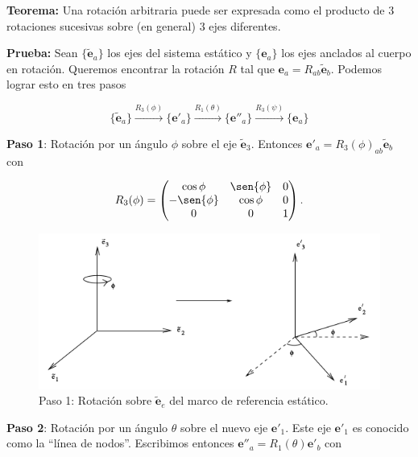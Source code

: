 \documentclass[a4paper,10pt]{article}
\numberwithin{equation}{section}
\newcommand{\teorema}{\textbf{Teorema: }}
\newcommand{\prueba}{\textbf{Prueba: }}
\begin{document}
\teorema Una rotación arbitraria puede ser expresada como el producto de $3$ rotaciones 
sucesivas sobre (en general) $3$ ejes diferentes.

\vspace{.3cm}

\prueba Sean $\{{\tilde{\mathbf{e}}_a\}}$ los ejes del sistema estático y 
$\{{\mathbf{e}_a\}}$ los ejes anclados al cuerpo en rotación. Queremos encontrar 
la rotación $R$ tal que $\mathbf{e}_a = R_{ab}{\tilde{\mathbf{e}}_b}$. Podemos 
lograr esto en tres pasos

\begin{equation}
 \{{\tilde{\mathbf{e}}_a\}} \xrightarrow{R_3(\phi)} 
 \{{\mathbf{e}'_a\}} \xrightarrow{R_1(\theta)} 
 \{{\mathbf{e}''_a\}} \xrightarrow{R_3(\psi)} \{{\mathbf{e}_a\}}
\end{equation}

\textbf{Paso 1}: Rotación por un ángulo $\phi$ sobre el eje $\tilde{\mathbf{e}}_3$. 
Entonces $\mathbf{e}'_a = R_3(\phi)_{ab}\tilde{\mathbf{e}}_b$ con 

\begin{equation}
 R_3(\phi) = \begin{pmatrix}
              \cos{\phi} & \sen{\phi} & 0 \\
	      -\sen{\phi} & \cos{\phi} & 0 \\
	      0 & 0 & 1
	     \end{pmatrix}.
\end{equation}

\begin{figure}[H]
  \center 
  \includegraphics[scale=0.6]{problema5fig2}
  \caption{Paso 1: Rotación sobre $\tilde{\mathbf{e}}_e$ del marco de referencia 
  estático.}
\end{figure}

\textbf{Paso 2}: Rotación por un ángulo $\theta$ sobre el nuevo eje $\mathbf{e}'_1$. 
Este eje $\mathbf{e}'_1$ es conocido como la ``línea de nodos''. Escribimos entonces 
$\mathbf{e}''_a = R_1(\theta)\mathbf{e}'_b$ con 
\end{document}
